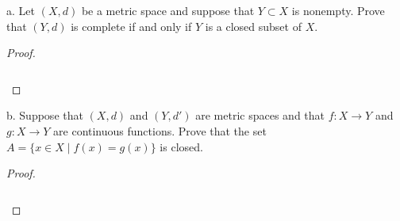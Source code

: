 a.  Let $(X, d)$ be a metric space and suppose that $Y \subset X$ is nonempty. Prove that $(Y, d)$ is complete if and
    only if $Y$ is a closed subset of $X$.

\begin{proof}\renewcommand{\qedsymbol}{}\ \\\\
    \begin{align*}
    \end{align*}
\end{proof}

\pagebreak


b. Suppose that $(X, d)$ and $(Y, d')$ are metric spaces and that $f:X \to Y$ and $g:X \to Y$ are continuous functions.
   Prove that the set $A = \{ x \in X \mid f(x) = g(x)\}$ is closed.

\begin{proof}\renewcommand{\qedsymbol}{}\ \\\\
    \begin{align*}
    \end{align*}
\end{proof}

\pagebreak
